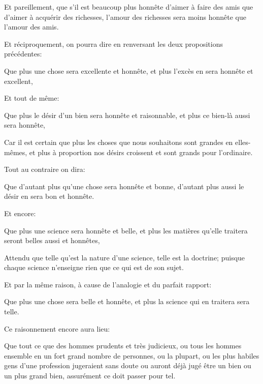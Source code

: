 Et pareillement, que s'il est beaucoup plus honnête d'aimer à faire des amis que d'aimer à acquérir des richesses,
l'amour des richesses sera moins honnête que l'amour des amis.

Et réciproquement, on pourra dire en renversant les deux propositions précédentes:

\begin{lieu}
	Que plus une chose sera excellente et honnête, et plus l'excès en sera honnête et excellent,
\end{lieu}

Et tout de même:

\begin{lieu}
	Que plus le désir d'un bien sera honnête et raisonnable, et plus ce bien-là aussi sera honnête,
\end{lieu}

Car il est certain que plus les choses que nous souhaitons sont grandes en elles-mêmes, et plus à proportion nos désirs
croissent et sont grands pour l'ordinaire.

\bigbreak

Tout au contraire on dira:

\begin{lieu}
	Que d'autant plus qu'une chose sera honnête et bonne, d'autant plus aussi le désir en sera bon et honnête.
\end{lieu}

Et encore:

\begin{lieu}
	Que plus une science sera honnête et belle, et plus les matières qu'elle traitera seront belles aussi et honnêtes,
\end{lieu}

Attendu que telle qu'est la nature d'une science, telle est la doctrine; puisque chaque science n'enseigne rien que ce qui
est de son sujet.

Et par la même raison, à cause de l'analogie et du parfait rapport:

\begin{lieu}
	Que plus une chose sera belle et honnête, et plus la science qui en traitera sera telle.
\end{lieu}

\bigbreak

Ce raisonnement encore aura lieu:

\begin{lieu}
	Que tout ce que des hommes prudents et très judicieux, ou tous les hommes ensemble en un fort grand nombre de personnes,
	ou la plupart, ou les plus habiles gens d'une profession jugeraient sans doute ou auront déjà jugé être un bien ou un plus
	grand bien, assurément ce doit passer pour tel.
\end{lieu}

